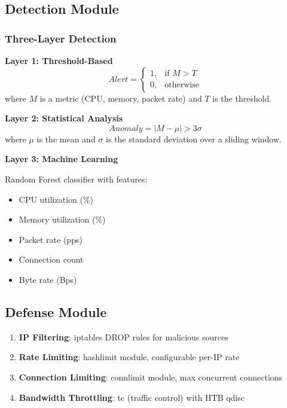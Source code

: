 \documentclass[conference]{IEEEtran}
\begin{document}
\subsection{Detection Module}

\subsubsection{Three-Layer Detection}

\textbf{Layer 1: Threshold-Based}
\begin{equation}
    Alert = \begin{cases}
        1, & \text{if } M > T \\
        0, & \text{otherwise}
    \end{cases}
\end{equation}
where $M$ is a metric (CPU, memory, packet rate) and $T$ is the threshold.

\textbf{Layer 2: Statistical Analysis}
\begin{equation}
    Anomaly = |M - \mu| > 3\sigma
\end{equation}
where $\mu$ is the mean and $\sigma$ is the standard deviation over a sliding window.

\textbf{Layer 3: Machine Learning}

Random Forest classifier with features:
\begin{itemize}
    \item CPU utilization (\%)
    \item Memory utilization (\%)
    \item Packet rate (pps)
    \item Connection count
    \item Byte rate (Bps)
\end{itemize}

\subsection{Defense Module}

\begin{enumerate}
    \item \textbf{IP Filtering}: iptables DROP rules for malicious sources
    \item \textbf{Rate Limiting}: hashlimit module, configurable per-IP rate
    \item \textbf{Connection Limiting}: connlimit module, max concurrent connections
    \item \textbf{Bandwidth Throttling}: tc (traffic control) with HTB qdisc
\end{enumerate}
\end{document}
